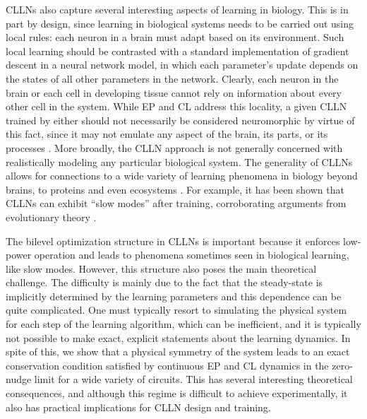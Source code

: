 \documentclass[final, 11pt, nonatbib]{elsarticle}
\theoremstyle{definition}
\theoremstyle{plain}
\newcommand{\AGK}{\color{blue}}
\numberwithin{equation}{section}
\begin{document}
CLLNs also capture several interesting aspects of learning in biology. This is in part by design, since learning in biological systems needs to be carried out using local rules: each neuron in a brain must adapt based on its environment. Such local learning should be contrasted with a standard implementation of gradient descent in a neural network model, in which each parameter's update depends on the states of all other parameters in the network. Clearly, each neuron in the brain or each cell in developing tissue cannot rely on information about every other cell in the system. While EP and CL address this locality, a given CLLN trained by either should not necessarily be considered neuromorphic by virtue of this fact, since it may not emulate any aspect of the brain, its parts, or its processes \cite{christensen2022RoadmapNeuromorphic2022, markovic2020physics}. More broadly, the CLLN approach is not generally concerned with realistically modeling any particular biological system. The generality of CLLNs allows for connections to a wide variety of learning phenomena in biology beyond brains, to proteins \cite{sternPhysicalNetworksBecome2024, sternPhysicalEffectsLearning2024} and even ecosystems \cite{dhanukaEcosystemsAdaptiveLiving2025}. For example, it has been shown \cite{guzmanMicroscopicImprintsLearned2024} that CLLNs can exhibit ``slow modes'' after training, corroborating arguments from evolutionary theory  \cite{husainPhysicalConstraintsEpistasis2020}. 

The bilevel optimization structure in CLLNs is important because it enforces low-power operation and leads to phenomena sometimes seen in biological learning, like slow modes.
However, this structure also poses the main theoretical challenge. 
The difficulty is mainly due to the fact that the steady-state is implicitly determined by the learning parameters and this dependence can be quite complicated. One must typically resort to simulating the physical system for each step of the learning algorithm, which can be inefficient, and it is typically not possible to make exact, explicit statements about the learning dynamics. In spite of this, we show that a physical symmetry of the system leads to an exact conservation condition satisfied by continuous EP and CL dynamics in the zero-nudge limit for a wide variety of circuits. This has several interesting theoretical consequences, and although this regime is difficult to achieve experimentally, it also has practical implications for CLLN design and training.
\end{document}
